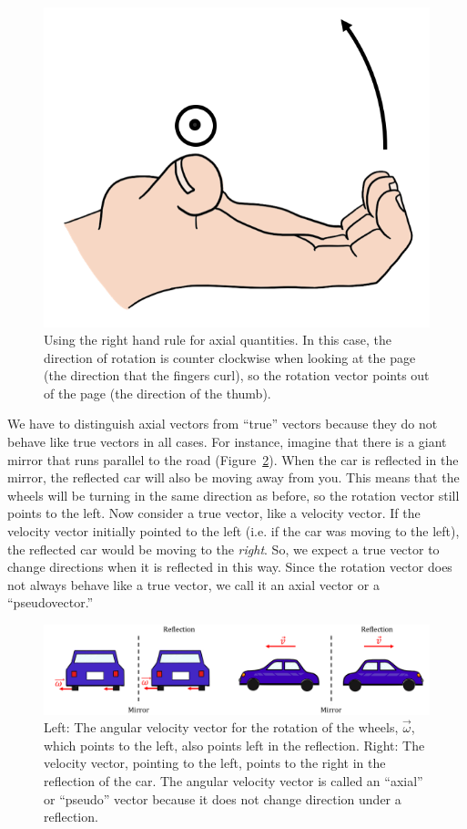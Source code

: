 \begin{figure}[!htbp]
\centering
\includegraphics[width=0.375\linewidth]{files/righthandruleaxial-54dbfdc774fe5213371ff87012fb8fd1.png}
\caption[]{Using the right hand rule for axial quantities. In this case, the direction of rotation is counter clockwise when looking at the page (the direction that the fingers curl), so the rotation vector points out of the page (the direction of the thumb).}
\label{fig:vectors:righthandruleaxial}
\end{figure}

We have to distinguish axial vectors from ``true'' vectors because they do not behave like true vectors in all cases.
For instance, imagine that there is a giant mirror that runs parallel to the road (Figure~\ref{fig:vectors:wheelmirror}). When the car is reflected in the mirror, the reflected car will also be moving away from you. This means that the wheels will be turning in the same direction as before, so the rotation vector still points to the left. Now consider a true vector, like a velocity vector. If the velocity vector initially pointed to the left (i.e. if the car was moving to the left), the reflected car would be moving to the \textit{right}. So, we expect a true vector to change directions when it is reflected in this way. Since the rotation vector does not always behave like a true vector, we call it an axial vector or a ``pseudovector.''

\begin{figure}[!htbp]
\centering
\includegraphics[width=1\linewidth]{files/carwheelmirror-4905ab3ad6241de2b3eb70d85ebdfc48.png}
\caption[]{Left: The angular velocity vector for the rotation of the wheels, $\vec \omega$, which points to the left, also points left in the reflection. Right: The velocity vector, pointing to the left, points to the right in the reflection of the car. The angular velocity vector is called an ``axial'' or ``pseudo'' vector because it does not change direction under a reflection.}
\label{fig:vectors:wheelmirror}
\end{figure}

